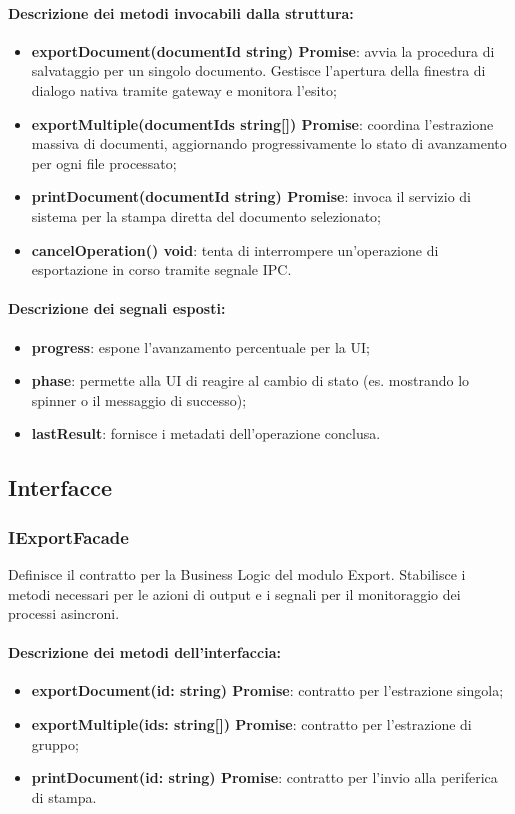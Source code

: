 \paragraph{Descrizione dei metodi invocabili dalla struttura:}
\begin{itemize}
\item \textbf{exportDocument(documentId string) Promise}: avvia la procedura di salvataggio per un singolo documento. Gestisce l'apertura della finestra di dialogo nativa tramite gateway e monitora l'esito;
\item \textbf{exportMultiple(documentIds string[]) Promise}: coordina l'estrazione massiva di documenti, aggiornando progressivamente lo stato di avanzamento per ogni file processato;
\item \textbf{printDocument(documentId string) Promise}: invoca il servizio di sistema per la stampa diretta del documento selezionato;
\item \textbf{cancelOperation() void}: tenta di interrompere un'operazione di esportazione in corso tramite segnale IPC.
\end{itemize}

\paragraph{Descrizione dei segnali esposti:}
\begin{itemize}
\item \textbf{progress}: espone l'avanzamento percentuale per la UI;
\item \textbf{phase}: permette alla UI di reagire al cambio di stato (es. mostrando lo spinner o il messaggio di successo);
\item \textbf{lastResult}: fornisce i metadati dell'operazione conclusa.
\end{itemize}

\subsection{Interfacce}

\subsubsection{IExportFacade}
Definisce il contratto per la Business Logic del modulo Export. Stabilisce i metodi necessari per le azioni di output e i segnali per il monitoraggio dei processi asincroni.

\paragraph{Descrizione dei metodi dell'interfaccia:}
\begin{itemize}
\item \textbf{exportDocument(id: string) Promise}: contratto per l'estrazione singola;
\item \textbf{exportMultiple(ids: string[]) Promise}: contratto per l'estrazione di gruppo;
\item \textbf{printDocument(id: string) Promise}: contratto per l'invio alla periferica di stampa.
\end{itemize}

